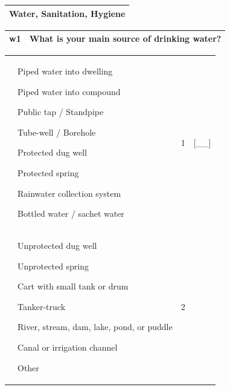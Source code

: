 \documentclass[12pt,a4paper]{book}
\theoremstyle{definition}
\theoremstyle{definition}
\theoremstyle{definition}
\theoremstyle{remark}
\begin{document}
\begin{longtable}[]{@{}c@{}}
\toprule
\begin{minipage}[t]{0.97\columnwidth}\centering
\textbf{Water, Sanitation, Hygiene}\strut
\end{minipage}\tabularnewline
\bottomrule
\end{longtable}

\begin{longtable}[]{@{}ll@{}}
\toprule
\begin{minipage}[t]{0.09\columnwidth}\raggedright
w1\strut
\end{minipage} & \begin{minipage}[t]{0.85\columnwidth}\raggedright
What is your main source of drinking water?\strut
\end{minipage}\tabularnewline
\bottomrule
\end{longtable}

\begin{longtable}[]{@{}llll@{}}
\toprule
\begin{minipage}[t]{0.24\columnwidth}\raggedright
\strut
\end{minipage} & \begin{minipage}[t]{0.24\columnwidth}\raggedright
Piped water into dwelling

Piped water into compound

Public tap / Standpipe

Tube-well / Borehole

Protected dug well

Protected spring

Rainwater collection system

Bottled water / sachet water\strut
\end{minipage} & \begin{minipage}[t]{0.24\columnwidth}\raggedright
1\strut
\end{minipage} & \begin{minipage}[t]{0.24\columnwidth}\raggedright
{[}\_\_{]}\strut
\end{minipage}\tabularnewline
\begin{minipage}[t]{0.24\columnwidth}\raggedright
\strut
\end{minipage} & \begin{minipage}[t]{0.24\columnwidth}\raggedright
Unprotected dug well

Unprotected spring

Cart with small tank or drum

Tanker-truck

River, stream, dam, lake, pond, or puddle

Canal or irrigation channel

Other\strut
\end{minipage} & \begin{minipage}[t]{0.24\columnwidth}\raggedright
2\strut
\end{minipage} & \begin{minipage}[t]{0.24\columnwidth}\raggedright
\strut
\end{minipage}\tabularnewline
\bottomrule
\end{longtable}
\end{document}
